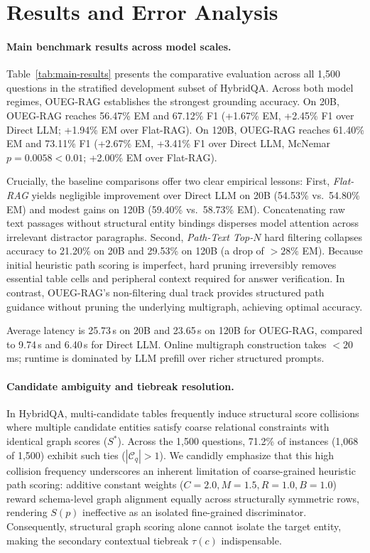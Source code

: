 \documentclass[runningheads]{llncs}
\begin{document}
\section{Results and Error Analysis}
\label{sec:results}

\paragraph{Main benchmark results across model scales.}
Table~\ref{tab:main-results} presents the comparative evaluation across all 1,500 questions in the stratified development subset of HybridQA. 
Across both model regimes, OUEG-RAG establishes the strongest grounding accuracy. On 20B, OUEG-RAG reaches 56.47\% EM and 67.12\% F1 (+1.67\% EM, +2.45\% F1 over Direct LLM; +1.94\% EM over Flat-RAG). On 120B, OUEG-RAG reaches 61.40\% EM and 73.11\% F1 (+2.67\% EM, +3.41\% F1 over Direct LLM, McNemar $p = 0.0058 < 0.01$; +2.00\% EM over Flat-RAG). 

Crucially, the baseline comparisons offer two clear empirical lessons:
First, \emph{Flat-RAG} yields negligible improvement over Direct LLM on 20B (54.53\% vs.\ 54.80\% EM) and modest gains on 120B (59.40\% vs.\ 58.73\% EM). Concatenating raw text passages without structural entity bindings disperses model attention across irrelevant distractor paragraphs.
Second, \emph{Path-Text Top-$N$} hard filtering collapses accuracy to 21.20\% on 20B and 29.53\% on 120B (a drop of $>28\%$ EM). Because initial heuristic path scoring is imperfect, hard pruning irreversibly removes essential table cells and peripheral context required for answer verification. In contrast, OUEG-RAG's non-filtering dual track provides structured path guidance without pruning the underlying multigraph, achieving optimal accuracy.

Average latency is 25.73\,s on 20B and 23.65\,s on 120B for OUEG-RAG, compared to 9.74\,s and 6.40\,s for Direct LLM. Online multigraph construction takes $<20$\,ms; runtime is dominated by LLM prefill over richer structured prompts.

\paragraph{Candidate ambiguity and tiebreak resolution.}
In HybridQA, multi-candidate tables frequently induce structural score collisions where multiple candidate entities satisfy coarse relational constraints with identical graph scores ($S^*$). Across the 1,500 questions, 71.2\% of instances (1,068 of 1,500) exhibit such ties ($|\mathcal{C}_q| > 1$). 
We candidly emphasize that this high collision frequency underscores an inherent limitation of coarse-grained heuristic path scoring: additive constant weights ($C=2.0, M=1.5, R=1.0, B=1.0$) reward schema-level graph alignment equally across structurally symmetric rows, rendering $S(p)$ ineffective as an isolated fine-grained discriminator. 
Consequently, structural graph scoring alone cannot isolate the target entity, making the secondary contextual tiebreak $\tau(c)$ indispensable.
\end{document}
